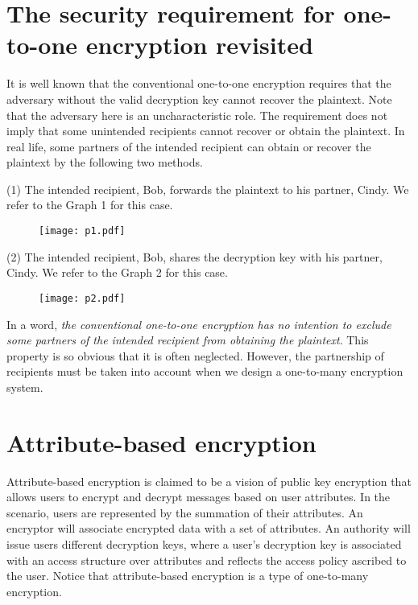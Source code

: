 \documentclass[11pt]{article}
\begin{document}
\section{The security requirement for one-to-one encryption revisited}

It is well known that the conventional one-to-one encryption requires that the adversary without the valid decryption key cannot recover the plaintext.
Note that the adversary here is an uncharacteristic role. The requirement does not imply that some unintended recipients cannot recover or obtain the plaintext.
In real life,  some partners of the intended recipient can obtain or recover the plaintext by the following two methods.

(1) The intended recipient, Bob, forwards the plaintext to his partner, Cindy. We refer to the Graph 1 for this case.
\begin{figure}[htbp]
\begin{minipage}[t]{.8\textwidth}
\hspace*{30mm}\texttt{[image: p1.pdf]}
\end{minipage}
\end{figure}

(2) The intended recipient, Bob, shares  the decryption key with his partner, Cindy. We refer to the Graph 2 for this case.
\begin{figure}[htbp]
\begin{minipage}[t]{.8\textwidth}
\hspace*{30mm} \texttt{[image: p2.pdf]}
\end{minipage}
\end{figure}

In a word,  \emph{the conventional one-to-one encryption has no intention to exclude some partners of the intended recipient from obtaining the plaintext}. This property is so obvious that it is often neglected.  However, the partnership of recipients must be taken into account when we design a one-to-many encryption system.


\section{Attribute-based encryption}

Attribute-based encryption  is claimed to be a vision of public key encryption that allows users to
encrypt and decrypt messages based on user attributes.
In the scenario, users are represented by the summation of their attributes. An encryptor will associate encrypted data with a set of attributes.
An authority will issue users different decryption  keys, where a user's decryption key is associated with an access structure over attributes and reflects
the access policy ascribed to the user. Notice that attribute-based encryption is a type of one-to-many encryption.
\end{document}
